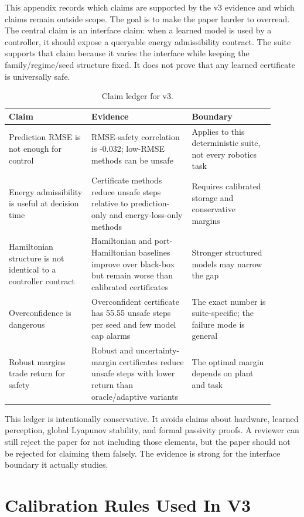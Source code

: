 \documentclass{article}
\begin{document}
This appendix records which claims are supported by the v3 evidence and which claims remain outside scope. The goal is to make the paper harder to overread. The central claim is an interface claim: when a learned model is used by a controller, it should expose a queryable energy admissibility contract. The suite supports that claim because it varies the interface while keeping the family/regime/seed structure fixed. It does not prove that any learned certificate is universally safe.

\begin{table}[h]
\centering
\small
\caption{Claim ledger for v3.}
\begin{tabular}{p{0.28\linewidth}p{0.34\linewidth}p{0.28\linewidth}}
\toprule
Claim & Evidence & Boundary \\
\midrule
Prediction RMSE is not enough for control & RMSE-safety correlation is -0.032; low-RMSE methods can be unsafe & Applies to this deterministic suite, not every robotics task \\
Energy admissibility is useful at decision time & Certificate methods reduce unsafe steps relative to prediction-only and energy-loss-only methods & Requires calibrated storage and conservative margins \\
Hamiltonian structure is not identical to a controller contract & Hamiltonian and port-Hamiltonian baselines improve over black-box but remain worse than calibrated certificates & Stronger structured models may narrow the gap \\
Overconfidence is dangerous & Overconfident certificate has 55.55 unsafe steps per seed and few model cap alarms & The exact number is suite-specific; the failure mode is general \\
Robust margins trade return for safety & Robust and uncertainty-margin certificates reduce unsafe steps with lower return than oracle/adaptive variants & The optimal margin depends on plant and task \\
\bottomrule
\end{tabular}
\end{table}

This ledger is intentionally conservative. It avoids claims about hardware, learned perception, global Lyapunov stability, and formal passivity proofs. A reviewer can still reject the paper for not including those elements, but the paper should not be rejected for claiming them falsely. The evidence is strong for the interface boundary it actually studies.

\section{Calibration Rules Used In V3}
\end{document}
